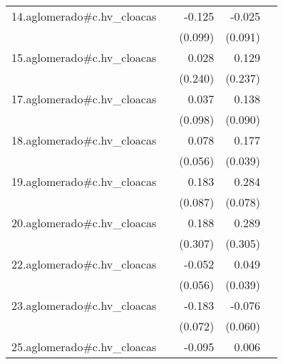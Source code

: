{\begin{longtable}{l*{4}{D{.}{.}{-1}}}
\addlinespace
14.aglomerado#c.hv\_cloacas&                     &      -0.125         &      -0.025         &                     \\
            &                     &     (0.099)         &     (0.091)         &                     \\
\addlinespace
15.aglomerado#c.hv\_cloacas&                     &       0.028         &       0.129         &                     \\
            &                     &     (0.240)         &     (0.237)         &                     \\
\addlinespace
17.aglomerado#c.hv\_cloacas&                     &       0.037         &       0.138         &                     \\
            &                     &     (0.098)         &     (0.090)         &                     \\
\addlinespace
18.aglomerado#c.hv\_cloacas&                     &       0.078         &       0.177\sym{***}&                     \\
            &                     &     (0.056)         &     (0.039)         &                     \\
\addlinespace
19.aglomerado#c.hv\_cloacas&                     &       0.183\sym{*}  &       0.284\sym{***}&                     \\
            &                     &     (0.087)         &     (0.078)         &                     \\
\addlinespace
20.aglomerado#c.hv\_cloacas&                     &       0.188         &       0.289         &                     \\
            &                     &     (0.307)         &     (0.305)         &                     \\
\addlinespace
22.aglomerado#c.hv\_cloacas&                     &      -0.052         &       0.049         &                     \\
            &                     &     (0.056)         &     (0.039)         &                     \\
\addlinespace
23.aglomerado#c.hv\_cloacas&                     &      -0.183\sym{*}  &      -0.076         &                     \\
            &                     &     (0.072)         &     (0.060)         &                     \\
\addlinespace
25.aglomerado#c.hv\_cloacas&                     &      -0.095         &       0.006         &                     \\

\end{longtable}}
